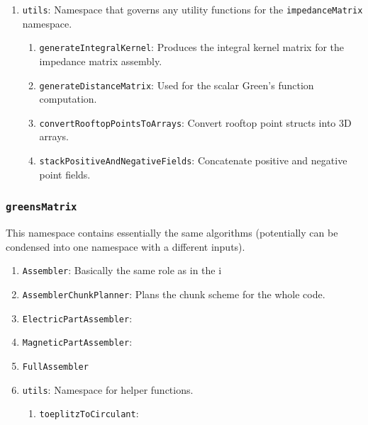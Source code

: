 \documentclass[9pt]{article}
\begin{document}
\begin{enumerate}[label=\Roman*.]
\begin{enumerate}[label=\roman*.]
            \item \texttt{generate}
            \item \texttt{generateImpl}
        \end{enumerate}
        \item \texttt{utils}: Namespace that governs any utility functions for the \texttt{impedanceMatrix} namespace.
        \begin{enumerate}[label=\roman*.]
            \item \texttt{generateIntegralKernel}: Produces the integral kernel matrix for the impedance matrix assembly.
            \item \texttt{generateDistanceMatrix}: Used for the scalar Green's function computation.
            \item \texttt{convertRooftopPointsToArrays}: Convert rooftop point structs into 3D arrays.
            \item \texttt{stackPositiveAndNegativeFields}: Concatenate positive and negative point fields.
        \end{enumerate}
    \end{enumerate}

    \subsubsection{\texttt{greensMatrix}}

    This namespace contains essentially the same algorithms (potentially can be condensed into one namespace with a different inputs).

    \begin{enumerate}[label=\Roman*.]
        \item \texttt{Assembler}: Basically the same role as in the i
        \item \texttt{AssemblerChunkPlanner}: Plans the chunk scheme for the whole code.
        \item \texttt{ElectricPartAssembler}:
        \item \texttt{MagneticPartAssembler}:
        \item \texttt{FullAssembler}
        \item \texttt{utils}: Namespace for helper functions.
        \begin{enumerate}[label=\roman*.]
            \item \texttt{toeplitzToCirculant}:
        \end{enumerate}
    \end{enumerate}
\end{document}
